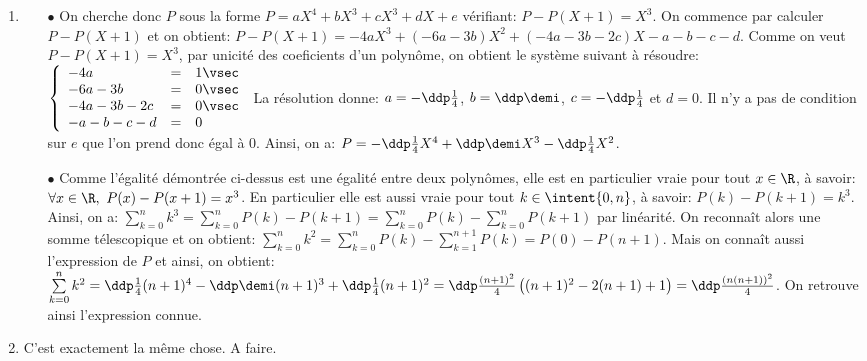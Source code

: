 \documentclass[a4paper, 11pt,reqno]{article}
\begin{document}
\begin{correction}
	\begin{enumerate}
		\item
		      \begin{itemize}
			      \item[$\bullet$] On cherche donc $P$ sous la forme $P=aX^4+bX^3+cX^3+dX+e$ v\'erifiant: $P-P(X+1)=X^3$. On commence par calculer $P-P(X+1)$ et on obtient: $P-P(X+1)= -4aX^3+(-6a-3b)X^2+(-4a-3b-2c)X-a-b-c-d$. Comme on veut $P-P(X+1)=X^3$, par unicit\'e des coeficients d'un polyn\^{o}me, on obtient le syst\`{e}me suivant \`{a} r\'esoudre:
			            $\left\lbrace\begin{array}{lll}  -4a&=&1\vsec\\-6a-3b&=&0\vsec\\-4a-3b-2c&=&0\vsec\\-a-b-c-d&=&0  \end{array}\right.$ La r\'esolution donne: $a=-\ddp\frac{1}{4}$, $b=\ddp\demi$, $c=-\ddp\frac{1}{4}$ et $d=0$. Il n'y a pas de condition sur $e$ que l'on prend donc \'egal \`{a} 0. Ainsi, on a: $P=-\ddp\frac{1}{4}X^4+\ddp\demi X^3-\ddp\frac{1}{4} X^2$.
			      \item[$\bullet$] Comme l'\'egalit\'e d\'emontr\'ee ci-dessus est une \'egalit\'e entre deux polyn\^{o}mes, elle est en particulier vraie pour tout $x\in\R$, \`{a} savoir: $\forall x\in\R,\ P(x)-P(x+1)=x^3$. En particulier elle est aussi vraie pour tout $k\in\intent{ 0,n}$, \`{a} savoir: $P(k)-P(k+1)=k^3$. Ainsi, on a: $\sum\limits_{k=0}^n k^3=\sum\limits_{k=0}^n P(k)-P(k+1)=\sum\limits_{k=0}^n P(k)-\sum\limits_{k=0}^n P(k+1)$ par lin\'earit\'e. On reconna\^{i}t alors une somme t\'elescopique et on obtient: $\sum\limits_{k=0}^n k^2=\sum\limits_{k=0}^n P(k)-\sum\limits_{k=1}^{n+1} P(k)=P(0)-P(n+1)$. Mais on conna\^{i}t aussi l'expression de $P$ et ainsi, on obtient: $\sum\limits_{k=0}^n k^2=\ddp\frac{1}{4}(n+1)^4-\ddp\demi (n+1)^3+\ddp\frac{1}{4} (n+1)^2=\ddp\frac{(n+1)^2}{4}\left( (n+1)^2-2(n+1)+1  \right)=\ddp\frac{(n(n+1))^2}{4}$. On retrouve ainsi l'expression connue.
		      \end{itemize}
		\item C'est exactement la m\^{e}me chose. A faire.
	\end{enumerate}
\end{correction}
\end{document}
